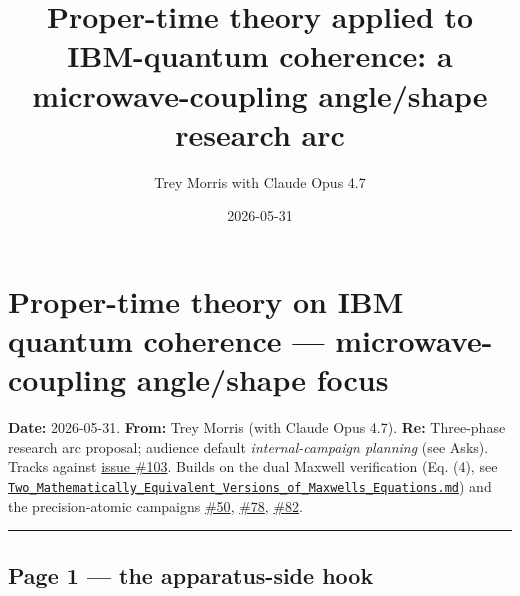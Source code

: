 \documentclass[
  11pt,
]{article}
\title{Proper-time theory applied to IBM-quantum coherence: a
microwave-coupling angle/shape research arc}
\author{Trey Morris with Claude Opus 4.7}
\date{2026-05-31}
\begin{document}
\maketitle

\hypertarget{proper-time-theory-on-ibm-quantum-coherence-microwave-coupling-angleshape-focus}{%
\section{Proper-time theory on IBM quantum coherence ---
microwave-coupling angle/shape
focus}\label{proper-time-theory-on-ibm-quantum-coherence-microwave-coupling-angleshape-focus}}

\textbf{Date:} 2026-05-31. \textbf{From:} Trey Morris (with Claude Opus
4.7). \textbf{Re:} Three-phase research arc proposal; audience default
\emph{internal-campaign planning} (see Asks). Tracks against
\href{https://github.com/temoTxt/PyPhysics/issues/103}{issue \#103}.
Builds on the dual Maxwell verification (Eq. (4), see
\href{../Equation_Verification/Two_Mathematically_Equivalent_Versions_of_Maxwells_Equations.md\#L188}{\texttt{Two\_Mathematically\_Equivalent\_Versions\_of\_Maxwells\_Equations.md}})
and the precision-atomic campaigns
\href{https://github.com/temoTxt/PyPhysics/issues/50}{\#50},
\href{https://github.com/temoTxt/PyPhysics/issues/78}{\#78},
\href{https://github.com/temoTxt/PyPhysics/issues/82}{\#82}.

\begin{center}\rule{0.5\linewidth}{0.5pt}\end{center}

\hypertarget{page-1-the-apparatus-side-hook}{%
\subsection{Page 1 --- the apparatus-side
hook}\label{page-1-the-apparatus-side-hook}}
\end{document}
